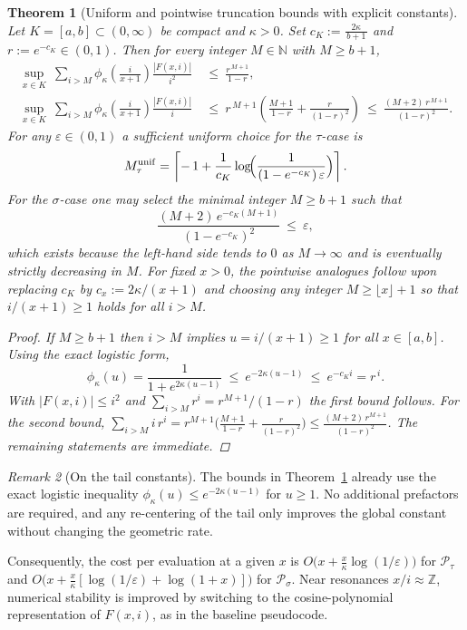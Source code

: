 \documentclass[11pt,a4paper]{amsart}
\theoremstyle{plain}
\newtheorem{theorem}{Theorem}[section]
\theoremstyle{definition}
\theoremstyle{remark}
\newtheorem{remark}[theorem]{Remark}
\begin{document}
\begin{theorem}[Uniform and pointwise truncation bounds with explicit constants]\label{thm:truncation}
Let $K=[a,b]\subset(0,\infty)$ be compact and $\kappa>0$. Set $c_K:=\frac{2\kappa}{\,b+1\,}$ and $r:=e^{-c_K}\in(0,1)$. Then for every integer $M\in\mathbb{N}$ with $M\ge b+1$,
\begin{align*}
\sup_{x\in K}\ \sum_{i>M}\phi_\kappa\!\left(\frac{i}{x+1}\right)\frac{|F(x,i)|}{i^2}
&\ \le\ \frac{r^{\,M+1}}{1-r},\\[4pt]
\sup_{x\in K}\ \sum_{i>M}\phi_\kappa\!\left(\frac{i}{x+1}\right)\frac{|F(x,i)|}{i}
&\ \le\ r^{\,M+1}\!\left(\frac{M+1}{1-r}+\frac{r}{(1-r)^2}\right)
\ \le\ \frac{(M+2)\,r^{\,M+1}}{(1-r)^2}.
\end{align*}
For any $\varepsilon\in(0,1)$ a sufficient uniform choice for the $\tau$-case is
\[
M_\tau^{\mathrm{unif}}=\left\lceil -\,1+\frac{1}{c_K}\log\!\Bigl(\frac{1}{(1-e^{-c_K})\,\varepsilon}\Bigr)\right\rceil.
\]
For the $\sigma$-case one may select the minimal integer $M\ge b+1$ such that
\[
\frac{(M+2)\,e^{-c_K(M+1)}}{(1-e^{-c_K})^2}\ \le\ \varepsilon,
\]
which exists because the left-hand side tends to $0$ as $M\to\infty$ and is eventually strictly decreasing in $M$. For fixed $x>0$, the pointwise analogues follow upon replacing $c_K$ by $c_x:=2\kappa/(x+1)$ and choosing any integer $M\ge \lfloor x\rfloor+1$ so that $i/(x+1)\ge 1$ holds for all $i>M$.
\begin{proof}
If $M\ge b+1$ then $i>M$ implies $u=i/(x+1)\ge 1$ for all $x\in[a,b]$. Using the exact logistic form,
\[
\phi_\kappa(u)=\frac{1}{1+e^{2\kappa(u-1)}}\ \le\ e^{-2\kappa(u-1)}\ \le\ e^{-c_K i}=r^{\,i}.
\]
With $|F(x,i)|\le i^2$ and $\sum_{i>M}r^i=r^{M+1}/(1-r)$ the first bound follows. For the second bound, $\sum_{i>M} i\,r^i=r^{M+1}\bigl(\frac{M+1}{1-r}+\frac{r}{(1-r)^2}\bigr)\le \frac{(M+2)\,r^{M+1}}{(1-r)^2}$. The remaining statements are immediate.
\end{proof}
\end{theorem}

\begin{remark}[On the tail constants]
The bounds in Theorem~\ref{thm:truncation} already use the exact logistic inequality $\phi_\kappa(u)\le e^{-2\kappa(u-1)}$ for $u\ge 1$. No additional prefactors are required, and any re-centering of the tail only improves the global constant without changing the geometric rate.
\end{remark}


Consequently, the cost per evaluation at a given $x$ is $O\!\bigl(x+\tfrac{x}{\kappa}\log(1/\varepsilon)\bigr)$ for $\mathcal P_\tau$ and $O\!\bigl(x+\tfrac{x}{\kappa}[\log(1/\varepsilon)+\log(1+x)]\bigr)$ for $\mathcal P_\sigma$. Near resonances $x/i\approx\mathbb{Z}$, numerical stability is improved by switching to the cosine-polynomial representation of $F(x,i)$, as in the baseline pseudocode.
\end{document}
